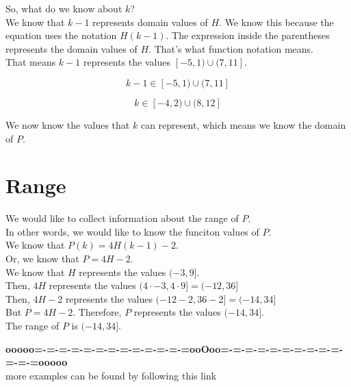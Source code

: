 \documentclass{ximera}
\begin{document}
So, what do we know about $k$? \\


We know that $k-1$ represents domain values of $H$.  We know this because the equation uses the notation $H(k-1)$.  The expression inside the parentheses represents the domain values of $H$.  That's what function notation means. \\


That means $k-1$ represents the values  $[-5, 1) \cup (7, 11]$.


\[
k - 1 \in [-5, 1) \cup (7, 11]
\]


\[
k \in [-4, 2) \cup (8, 12]
\]



We now know the values that $k$ can represent, which means we know the domain of $P$. \\












\section*{Range}


We would like to collect information about the range of $P$. \\

In other words, we would like to know the funciton values of $P$. \\ 


We know that $P(k) = 4 H(k-1) - 2$.\\


Or, we know that $P = 4 H - 2$. \\



We know that $H$ represents the values $(-3, 9]$. \\


Then, $4 H$ represents the values $(4 \cdot -3, 4 \cdot 9] = (-12, 36]$ \\



Then, $4 H - 2$ represents the values $(-12 - 2, 36 - 2] = (-14, 34]$ \\


But $P = 4 H - 2$.  Therefore, $P$ represents the values $(-14, 34]$. \\


The range of $P$ is $(-14, 34]$.









\begin{center}
\textbf{\textcolor{green!50!black}{ooooo=-=-=-=-=-=-=-=-=-=-=-=-=ooOoo=-=-=-=-=-=-=-=-=-=-=-=-=ooooo}} \\

more examples can be found by following this link\\ 

\end{center}
\end{document}
